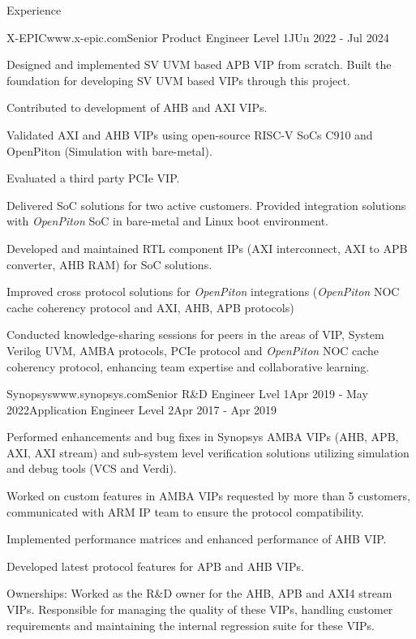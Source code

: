 \documentclass[
11pt, %
]{./assets/resume} %
\begin{document}
\begin{rSection}{Experience}
	\begin{rSubsectionX}{X-EPIC}{www.x-epic.com}{Senior Product Engineer Level 1}{JUn 2022 - Jul 2024}
		\item Designed and implemented SV UVM based APB VIP from scratch. Built the foundation for developing SV UVM based VIPs through this project.
		\item Contributed to development of AHB and AXI VIPs.
		\item Validated AXI and AHB VIPs using open-source RISC-V SoCs C910 and OpenPiton (Simulation with bare-metal).
		\item Evaluated a third party PCIe VIP.
		\item Delivered SoC solutions for two active customers. Provided integration solutions with \textit{OpenPiton} SoC in bare-metal and Linux boot environment.
		\item Developed and maintained RTL component IPs (AXI interconnect, AXI to APB converter, AHB RAM) for SoC solutions.
		\item Improved cross protocol solutions for \textit{OpenPiton} integrations (\textit{OpenPiton} NOC cache coherency protocol and AXI, AHB, APB protocols)
		\item Conducted knowledge-sharing sessions for peers in the areas of VIP, System Verilog UVM, AMBA protocols, PCIe protocol and \textit{OpenPiton} NOC cache coherency protocol, enhancing team expertise and collaborative learning.
	\end{rSubsectionX}
	\begin{rSubsectionM}{Synopsys}{www.synopsys.com}{Senior R\&D Engineer Lvel 1}{Apr 2019 - May 2022}{Application Engineer Level 2}{Apr 2017 - Apr 2019}{}{}
		\item Performed enhancements and bug fixes in Synopsys AMBA VIPs (AHB, APB, AXI, AXI stream) and sub-system level verification solutions utilizing simulation and debug tools (VCS and Verdi).
		\item Worked on custom features in AMBA VIPs requested by more than 5 customers, communicated with ARM IP team to ensure the protocol compatibility.
		\item Implemented performance matrices and enhanced performance of AHB VIP.
		\item Developed latest protocol features for APB and AHB VIPs.
		\item Ownerships: Worked as the R\&D owner for the AHB, APB and AXI4 stream VIPs. Responsible for managing the quality of these VIPs, handling customer requirements and maintaining the internal regression suite for these VIPs.

\end{rSubsectionM}
\end{rSection}
\end{document}

